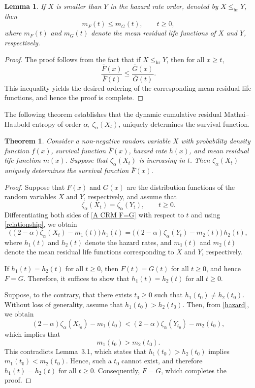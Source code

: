 \documentclass[11pt,reqno]{amsart}
\theoremstyle{tight}
\newtheorem{theorem}{Theorem}[section]
\newtheorem{lemma}{Lemma}[section]
\begin{document}
\begin{lemma}
If $X$ is smaller than $Y$ in the hazard rate order, denoted by $X \leq_{\mathrm{hr}} Y$,
then
\[
m_{F}(t) \leq m_{G}(t), \qquad t \ge 0,
\]
where $m_{F}(t)$ and $m_{G}(t)$ denote the mean residual life functions of $X$ and $Y$,
respectively.
\end{lemma}
\begin{proof}
The proof follows from the fact that if $X \leq_{\mathrm{hr}} Y$, then for all $x \ge t$,
\[
\frac{\bar{F}(x)}{\bar{F}(t)} \leq \frac{\bar{G}(x)}{\bar{G}(t)}.
\]
This inequality yields the desired ordering of the corresponding mean residual life
functions, and hence the proof is complete.
\end{proof}
The following theorem establishes that the dynamic cumulative residual Mathai--Haubold
entropy of order $\alpha$, $\zeta_{\alpha}(X_t)$, uniquely determines the survival function.

\begin{theorem}
 Consider a non-negative random variable $X$ with probability density function $f(x)$,
survival function $\bar{F}(x)$, hazard rate $h(x)$, and mean residual life function
$m(x)$. Suppose that $\zeta_{\alpha}(X_t)$ is increasing in $t$. Then
$\zeta_{\alpha}(X_t)$ uniquely determines the survival function $\bar{F}(x)$.
\end{theorem}
 \begin{proof}
Suppose that $F(x)$ and $G(x)$ are the distribution functions of the random variables
$X$ and $Y$, respectively, and assume that
\begin{equation}\label{A CRM F=G}
\zeta_{\alpha}(X_t)=\zeta_{\alpha}(Y_t), \qquad t \ge 0 .
\end{equation}
Differentiating both sides of \eqref{A CRM F=G} with respect to $t$ and using
\eqref{relationship}, we obtain
\begin{equation}\label{hazard}
\bigl((2-\alpha)\zeta_{\alpha}(X_t)-m_{1}(t)\bigr)\,h_{1}(t)
=
\bigl((2-\alpha)\zeta_{\alpha}(Y_t)-m_{2}(t)\bigr)\,h_{2}(t),
\end{equation}
where $h_{1}(t)$ and $h_{2}(t)$ denote the hazard rates, and $m_{1}(t)$ and $m_{2}(t)$
denote the mean residual life functions corresponding to $X$ and $Y$, respectively.

If $h_{1}(t)=h_{2}(t)$ for all $t \ge 0$, then $\bar{F}(t)=\bar{G}(t)$ for all
$t \ge 0$, and hence $F=G$. Therefore, it suffices to show that
$h_{1}(t)=h_{2}(t)$ for all $t \ge 0$.

Suppose, to the contrary, that there exists $t_0 \ge 0$ such that
$h_{1}(t_0)\neq h_{2}(t_0)$. Without loss of generality, assume that
$h_{1}(t_0)>h_{2}(t_0)$. Then, from \eqref{hazard}, we obtain
\[
(2-\alpha)\zeta_{\alpha}(X_{t_0})-m_{1}(t_0)
<
(2-\alpha)\zeta_{\alpha}(Y_{t_0})-m_{2}(t_0),
\]
which implies that
\[
m_{1}(t_0)>m_{2}(t_0).
\]
This contradicts Lemma~3.1, which states that $h_{1}(t_0)>h_{2}(t_0)$ implies
$m_{1}(t_0)<m_{2}(t_0)$. Hence, such a $t_0$ cannot exist, and therefore
$h_{1}(t)=h_{2}(t)$ for all $t \ge 0$. Consequently, $F=G$, which completes the proof.
\end{proof}
\end{document}
